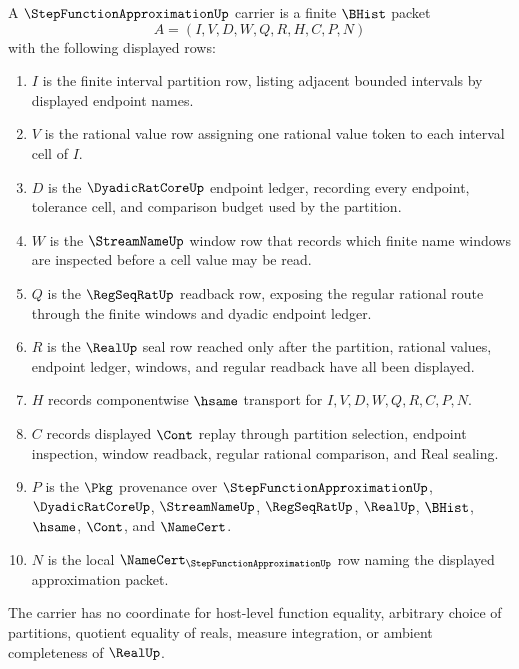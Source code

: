 \begin{definition}
\label{def:step-function-approximation-carrier}
A $\StepFunctionApproximationUp$ carrier is a finite $\BHist$ packet
$$
A=(I,V,D,W,Q,R,H,C,P,N)
$$
with the following displayed rows:
\begin{enumerate}
\item $I$ is the finite interval partition row, listing adjacent bounded intervals by displayed endpoint names.
\item $V$ is the rational value row assigning one rational value token to each interval cell of $I$.
\item $D$ is the $\DyadicRatCoreUp$ endpoint ledger, recording every endpoint, tolerance cell, and comparison budget used by the partition.
\item $W$ is the $\StreamNameUp$ window row that records which finite name windows are inspected before a cell value may be read.
\item $Q$ is the $\RegSeqRatUp$ readback row, exposing the regular rational route through the finite windows and dyadic endpoint ledger.
\item $R$ is the $\RealUp$ seal row reached only after the partition, rational values, endpoint ledger, windows, and regular readback have all been displayed.
\item $H$ records componentwise $\hsame$ transport for $I,V,D,W,Q,R,C,P,N$.
\item $C$ records displayed $\Cont$ replay through partition selection, endpoint inspection, window readback, regular rational comparison, and Real sealing.
\item $P$ is the $\Pkg$ provenance over $\StepFunctionApproximationUp$, $\DyadicRatCoreUp$, $\StreamNameUp$, $\RegSeqRatUp$, $\RealUp$, $\BHist$, $\hsame$, $\Cont$, and $\NameCert$.
\item $N$ is the local $\NameCert_{\StepFunctionApproximationUp}$ row naming the displayed approximation packet.
\end{enumerate}
The carrier has no coordinate for host-level function equality, arbitrary choice of partitions, quotient equality of reals, measure integration, or ambient completeness of $\RealUp$.
\end{definition}

